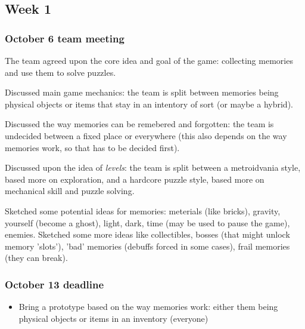 \subsection{Week 1}

\subsubsection{October 6 team meeting}
The team agreed upon the core idea and goal of the game: collecting memories and use them to solve puzzles. \par
Discussed main game mechanics: the team is split between memories being physical objects or items that stay in an intentory of sort (or maybe a hybrid). \par
Discussed the way memories can be remebered and forgotten: the team is undecided between a fixed place or everywhere (this also depends on the way memories work, so that has to be decided first). \par
Discussed upon the idea of \textit{levels}: the team is split between a metroidvania style, based more on exploration, and a hardcore puzzle style, based more on mechanical skill and puzzle solving. \par
Sketched some potential ideas for memories: meterials (like bricks), gravity, yourself (become a ghost), light, dark, time (may be used to pause the game), enemies. Sketched some more ideas like collectibles, bosses (that might unlock memory 'slots'), 'bad' memories (debuffs forced in some cases), frail memories (they can break).

\subsubsection{October 13 deadline}
\begin{itemize}
    \item Bring a prototype based on the way memories work: either them being physical objects or items in an inventory (everyone)
\end{itemize}
